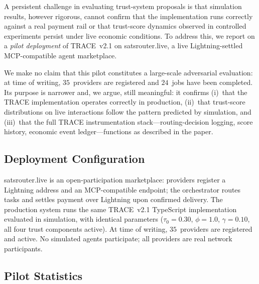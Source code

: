 \documentclass[sigconf,nonacm,10pt]{acmart}
\begin{document}
A persistent challenge in evaluating trust-system proposals is that
simulation results, however rigorous, cannot confirm that the
implementation runs correctly against a real payment rail or that
trust-score dynamics observed in controlled experiments persist
under live economic conditions. To address this, we report on a
\emph{pilot deployment} of TRACE~v2.1 on satsrouter.live, a live
Lightning-settled MCP-compatible agent marketplace.

We make no claim that this pilot constitutes a large-scale
adversarial evaluation: at time of writing, $35$~providers are
registered and $24$~jobs have been completed. Its purpose is
narrower and, we argue, still meaningful: it confirms (i)~that the
TRACE implementation operates correctly in production, (ii)~that
trust-score distributions on live interactions follow the pattern
predicted by simulation, and (iii)~that the full TRACE
instrumentation stack---routing-decision logging, score history,
economic event ledger---functions as described in the paper.

\subsection{Deployment Configuration}

satsrouter.live is an open-participation marketplace: providers register
a Lightning address and an MCP-compatible endpoint; the orchestrator
routes tasks and settles payment over Lightning upon confirmed delivery.
The production system runs the same TRACE~v2.1 TypeScript implementation
evaluated in simulation, with identical parameters ($\tau_0 = 0.30$,
$\phi = 1.0$, $\gamma = 0.10$, all four trust components active).
At time of writing, $35$~providers are registered and active. No
simulated agents participate; all providers are real network participants.

\subsection{Pilot Statistics}
\end{document}
